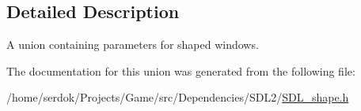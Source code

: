\subsection{Detailed Description}
A union containing parameters for shaped windows. 

The documentation for this union was generated from the following file\+:\begin{DoxyCompactItemize}
\item 
/home/serdok/\+Projects/\+Game/src/\+Dependencies/\+S\+D\+L2/\hyperlink{SDL__shape_8h}{S\+D\+L\+\_\+shape.\+h}\end{DoxyCompactItemize}
